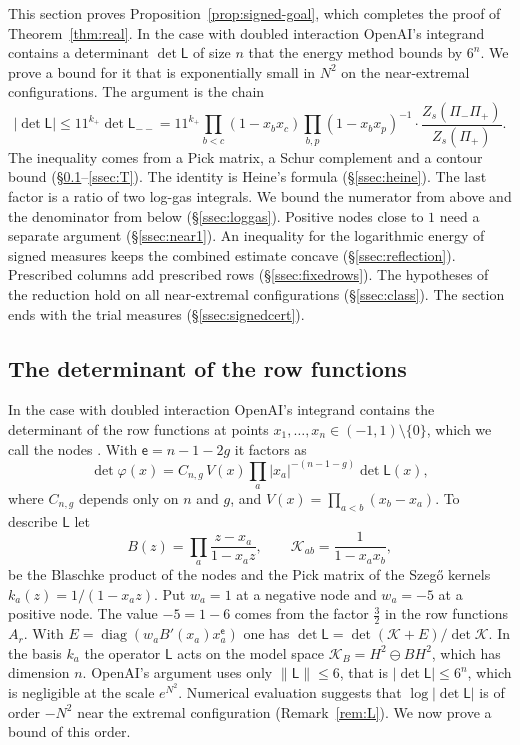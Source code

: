 \documentclass[11pt]{amsart}
\theoremstyle{definition}
\theoremstyle{remark}
\numberwithin{equation}{section}
\newcommand{\cK}{\mathcal K}
\begin{document}
This section proves Proposition~\ref{prop:signed-goal}, which completes the proof of Theorem~\ref{thm:real}.
In the case with doubled interaction OpenAI's integrand contains a determinant $\det\mathsf L$ of size $n$
that the energy method bounds by $6^n$. We prove a bound for it that is exponentially small in $N^2$ on
the near-extremal configurations. The argument is the chain
\begin{equation}\label{eq:chain}
 |\det\mathsf L|\le11^{k_+}\det\mathsf L_{--}
 =11^{k_+}\prod_{b<c}(1-x_bx_c)\prod_{b,p}(1-x_bx_p)^{-1}\cdot\frac{Z_s(\Pi_-\Pi_+)}{Z_s(\Pi_+)} .
\end{equation}
The inequality comes from a Pick matrix, a Schur complement and a contour bound
(\S\ref{ssec:pick}--\ref{ssec:T}). The identity is Heine's formula (\S\ref{ssec:heine}). The last factor is a
ratio of two log-gas integrals. We bound the numerator from above and the denominator from below
(\S\ref{ssec:loggas}). Positive nodes close to $1$ need a separate argument (\S\ref{ssec:near1}). An
inequality for the logarithmic energy of signed measures keeps the combined estimate concave
(\S\ref{ssec:reflection}). Prescribed columns add prescribed rows (\S\ref{ssec:fixedrows}). The hypotheses of
the reduction hold on all near-extremal configurations (\S\ref{ssec:class}). The section ends with the trial
measures (\S\ref{ssec:signedcert}).

\subsection{The determinant of the row functions}\label{ssec:pick}
In the case with doubled interaction OpenAI's integrand contains the determinant of the row functions at
points $x_1,\ldots,x_n\in(-1,1)\setminus\{0\}$, which we call the nodes \cite[Prop.~5.3]{OpenAI2026}. With
$\mathsf e=n-1-2g$ it factors as
\begin{equation}\label{eq:detphi}
 \det\varphi(x)=C_{n,g}\,V(x)\prod_a|x_a|^{-(n-1-g)}\det\mathsf L(x),
\end{equation}
where $C_{n,g}$ depends only on $n$ and $g$, and $V(x)=\prod_{a<b}(x_b-x_a)$. To describe $\mathsf L$ let
\[
 B(z)=\prod_a\frac{z-x_a}{1-x_az},\qquad \cK_{ab}=\frac1{1-x_ax_b},
\]
be the Blaschke product of the nodes and the Pick matrix of the Szeg\H{o} kernels $k_a(z)=1/(1-x_az)$. Put
$w_a=1$ at a negative node and $w_a=-5$ at a positive node. The value $-5=1-6$ comes from the factor
$\frac32$ in the row functions $A_r$. With $E=\operatorname{diag}(w_aB'(x_a)x_a^{\mathsf e})$ one has
$\det\mathsf L=\det(\cK+E)/\det\cK$. In the basis $k_a$ the operator $\mathsf L$ acts on the model space
$\cK_B=H^2\ominus BH^2$, which has dimension $n$. OpenAI's argument uses only $\|\mathsf L\|\le6$, that is
$|\det\mathsf L|\le6^n$, which is negligible at the scale $e^{N^2}$. Numerical evaluation suggests that
$\log|\det\mathsf L|$ is of order $-N^2$ near the extremal configuration (Remark~\ref{rem:L}). We now prove a
bound of this order.
\end{document}
